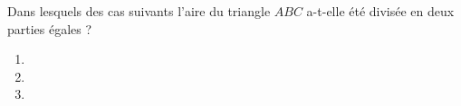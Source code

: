 
\begin{exercice}\label{exo2smath-0270}

    Dans lesquels des cas suivants l'aire du triangle \( ABC\) a-t-elle été divisée en deux parties égales ?

    \begin{multicols}{2}

        \begin{enumerate}
            \item
   
   \item
   
   \item
   
        \end{enumerate}
    \end{multicols}

\end{exercice}
